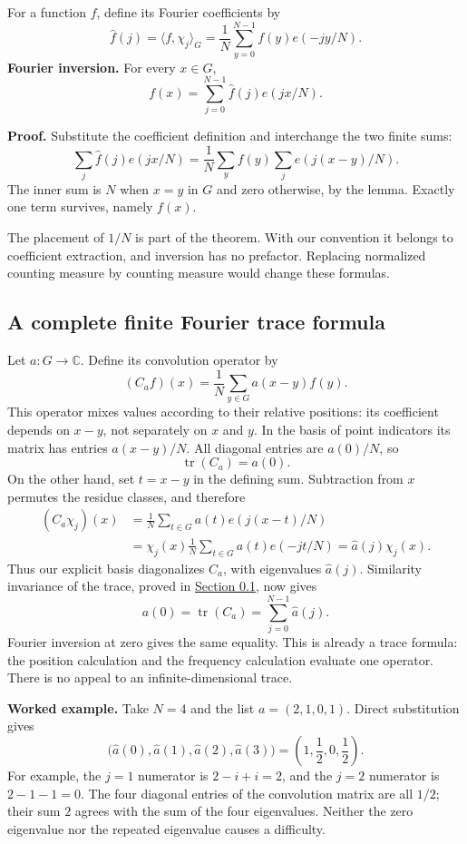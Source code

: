 For a function \(f\), define its Fourier coefficients by
\[
\widehat f(j)=\langle f,\chi_j\rangle_G
=\frac1N\sum_{y=0}^{N-1}f(y)e(-jy/N).
\]
\textbf{Fourier inversion.} For every \(x\in G\),
\[
f(x)=\sum_{j=0}^{N-1}\widehat f(j)e(jx/N).
\]

\textbf{Proof.} Substitute the coefficient definition and interchange the two finite sums:
\[
\sum_j\widehat f(j)e(jx/N)
=\frac1N\sum_y f(y)\sum_j e(j(x-y)/N).
\]
The inner sum is \(N\) when \(x=y\) in \(G\) and zero otherwise, by the lemma. Exactly one term survives, namely \(f(x)\).

The placement of \(1/N\) is part of the theorem. With our convention it belongs to coefficient extraction, and inversion has no prefactor. Replacing normalized counting measure by counting measure would change these formulas.

\subsection{A complete finite Fourier trace formula}\label{finite-fourier-trace}

Let \(a:G\to\mathbb C\). Define its convolution operator by
\[
(C_a f)(x)=\frac1N\sum_{y\in G}a(x-y)f(y).
\]
This operator mixes values according to their relative positions: its coefficient depends on \(x-y\), not separately on \(x\) and \(y\). In the basis of point indicators its matrix has entries \(a(x-y)/N\). All diagonal entries are \(a(0)/N\), so
\[
\operatorname{tr}(C_a)=a(0).
\]
On the other hand, set \(t=x-y\) in the defining sum. Subtraction from \(x\) permutes the residue classes, and therefore
\[
\begin{aligned}
(C_a\chi_j)(x)
&=\frac1N\sum_{t\in G}a(t)e(j(x-t)/N)\\
&=\chi_j(x)\frac1N\sum_{t\in G}a(t)e(-jt/N)
=\widehat a(j)\chi_j(x).
\end{aligned}
\]
Thus our explicit basis diagonalizes \(C_a\), with eigenvalues \(\widehat a(j)\). Similarity invariance of the trace, proved in \hyperref[v1a-ch00-s1]{Section 0.1}, now gives
\[
\boxed{\quad a(0)=\operatorname{tr}(C_a)
=\sum_{j=0}^{N-1}\widehat a(j).\quad}
\]
Fourier inversion at zero gives the same equality. This is already a trace formula: the position calculation and the frequency calculation evaluate one operator. There is no appeal to an infinite-dimensional trace.

\textbf{Worked example.} Take \(N=4\) and the list
\(a=(2,1,0,1)\). Direct substitution gives
\[
\bigl(\widehat a(0),\widehat a(1),\widehat a(2),\widehat a(3)\bigr)
=\left(1,\frac12,0,\frac12\right).
\]
For example, the \(j=1\) numerator is \(2-i+i=2\), and the \(j=2\) numerator is \(2-1-1=0\). The four diagonal entries of the convolution matrix are all \(1/2\); their sum \(2\) agrees with the sum of the four eigenvalues. Neither the zero eigenvalue nor the repeated eigenvalue causes a difficulty.

